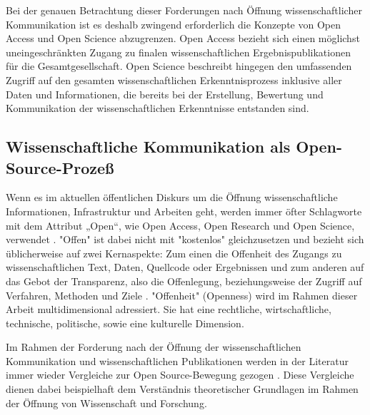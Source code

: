 Bei der genauen Betrachtung dieser Forderungen nach Öffnung wissenschaftlicher Kommunikation ist es deshalb zwingend erforderlich die Konzepte von Open Access und Open Science abzugrenzen. Open Access bezieht sich einen möglichst uneingeschränkten Zugang zu finalen wissenschaftlichen Ergebnispublikationen für die Gesamtgesellschaft. Open Science beschreibt hingegen den umfassenden Zugriff auf den gesamten wissenschaftlichen Erkenntnisprozess inklusive aller Daten und Informationen, die bereits bei der Erstellung, Bewertung und Kommunikation der wissenschaftlichen Erkenntnisse entstanden sind.

\subsection{Wissenschaftliche Kommunikation als Open-Source-Prozeß}

Wenn es im aktuellen öffentlichen Diskurs um die Öffnung wissenschaftliche Informationen, Infrastruktur und Arbeiten geht, werden immer öfter Schlagworte mit dem Attribut „Open“, wie Open Access, Open Research und Open Science, verwendet \cite{bunz_2014} \cite{schulze_2013_open}. "Offen" ist dabei nicht mit "kostenlos" gleichzusetzen \cite{grand_2012_open} und bezieht sich üblicherweise auf zwei Kernaspekte: Zum einen die Offenheit des Zugangs zu wissenschaftlichen Text, Daten, Quellcode oder Ergebnissen und zum anderen auf das Gebot der Transparenz, also die Offenlegung, beziehungsweise der Zugriff auf Verfahren, Methoden und Ziele \cite{schulze_2013_open}. "Offenheit" (Openness) wird im Rahmen dieser Arbeit multidimensional adressiert. Sie hat eine rechtliche, wirtschaftliche, technische, politische, sowie eine kulturelle Dimension.

Im Rahmen der Forderung nach der Öffnung der wissenschaftlichen Kommunikation und wissenschaftlichen Publikationen werden in der Literatur immer wieder Vergleiche zur Open Source-Bewegung gezogen  \cite{cite:9} \cite{Peters_2014} \cite{RIN_2010_open_research} \cite[:423]{mantz_2007_open} \cite{cite:1}. Diese Vergleiche dienen dabei beispielhaft dem Verständnis theoretischer Grundlagen im Rahmen der Öffnung von Wissenschaft und Forschung.

